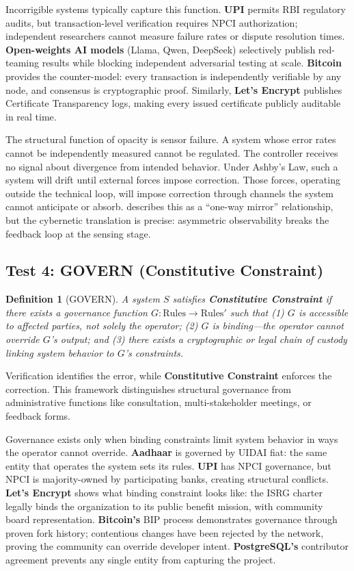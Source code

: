\documentclass{article}
\newtheorem{definition}{Definition}
\begin{document}
Incorrigible systems typically capture this function. \textbf{UPI} permits RBI regulatory audits, but transaction-level verification requires NPCI authorization; independent researchers cannot measure failure rates or dispute resolution times. \textbf{Open-weights AI models} (Llama, Qwen, DeepSeek) selectively publish red-teaming results while blocking independent adversarial testing at scale. \textbf{Bitcoin} provides the counter-model: every transaction is independently verifiable by any node, and consensus is cryptographic proof. Similarly, \textbf{Let's Encrypt} publishes Certificate Transparency logs, making every issued certificate publicly auditable in real time.

The structural function of opacity is sensor failure. A system whose error rates cannot be independently measured cannot be regulated. The controller receives no signal about divergence from intended behavior. Under Ashby's Law, such a system will drift until external forces impose correction. Those forces, operating outside the technical loop, will impose correction through channels the system cannot anticipate or absorb. \citet{pasquale2015} describes this as a ``one-way mirror'' relationship, but the cybernetic translation is precise: asymmetric observability breaks the feedback loop at the sensing stage.

\subsection{Test 4: GOVERN (Constitutive Constraint)}

\begin{definition}[GOVERN]
\label{def:govern}
A system $S$ satisfies \textbf{Constitutive Constraint} if there exists a governance function $G: \text{Rules} \to \text{Rules}'$ such that (1) $G$ is accessible to affected parties, not solely the operator; (2) $G$ is binding---the operator cannot override $G$'s output; and (3) there exists a cryptographic or legal chain of custody linking system behavior to $G$'s constraints.
\end{definition}

Verification identifies the error, while \textbf{Constitutive Constraint} enforces the correction. This framework distinguishes structural governance from administrative functions like consultation, multi-stakeholder meetings, or feedback forms.

Governance exists only when binding constraints limit system behavior in ways the operator cannot override. \textbf{Aadhaar} is governed by UIDAI fiat: the same entity that operates the system sets its rules. \textbf{UPI} has NPCI governance, but NPCI is majority-owned by participating banks, creating structural conflicts. \textbf{Let's Encrypt} shows what binding constraint looks like: the ISRG charter legally binds the organization to its public benefit mission, with community board representation. \textbf{Bitcoin's} BIP process demonstrates governance through proven fork history; contentious changes have been rejected by the network, proving the community can override developer intent. \textbf{PostgreSQL's} contributor agreement prevents any single entity from capturing the project.
\end{document}
